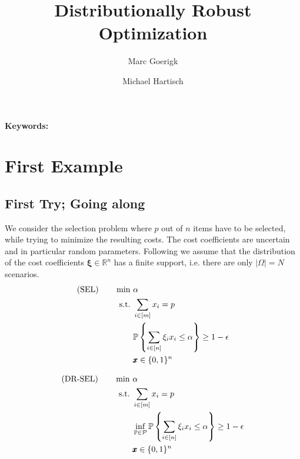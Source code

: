 \documentclass[a4paper,abstracton]{scrartcl}
\begin{document}


\title{Distributionally Robust Optimization}

\author{Marc Goerigk}
\author{Michael Hartisch}


    
\date{}

\maketitle



\begin{abstract}

\end{abstract}

\noindent\textbf{Keywords:} 

\section{First Example}
\subsection{First Try; Going along \cite{wang2019solution}}
We consider the selection problem where $p$ out of $n$ items have to be selected, while trying to minimize the resulting costs. The cost coefficients are uncertain and in particular random parameters.
 Following  \cite{wang2019solution} we assume that the distribution of the cost coefficients $\pmb{\xi}\in \mathbb{R}^n$ has a finite support, i.e. there are only $\vert\Omega\vert=N$ scenarios. 
\begin{align*}
\textnormal{(SEL)} \qquad\min \ & \alpha\\
\textnormal{s.t.}\ & \sum_{i \in [m]} x_i =p \\
&\mathbb{P}\left\lbrace\sum_{i \in [n]}\xi_i x_i \leq \alpha\right\rbrace \geq 1-\epsilon\\
& \pmb{x} \in \{0,1\}^n
\end{align*}

\begin{align*}
\textnormal{(DR-SEL)} \qquad\min \ & \alpha\\
\textnormal{s.t.}\ & \sum_{i \in [m]} x_i =p \\
&\inf_{\mathbb{P}\in \mathcal{P}}\mathbb{P}\left\lbrace\sum_{i \in [n]}\xi_i x_i \leq \alpha\right\rbrace \geq 1-\epsilon\\
& \pmb{x} \in \{0,1\}^n
\end{align*}
\end{document}
